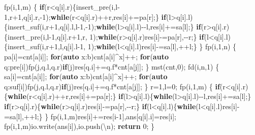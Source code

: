 \documentclass[
]{article}
\newenvironment{Shaded}{}{}
\newcommand{\CharTok}[1]{\textcolor[rgb]{0.25,0.44,0.63}{#1}}
\newcommand{\ControlFlowTok}[1]{\textcolor[rgb]{0.00,0.44,0.13}{\textbf{#1}}}
\newcommand{\DecValTok}[1]{\textcolor[rgb]{0.25,0.63,0.44}{#1}}
\newcommand{\KeywordTok}[1]{\textcolor[rgb]{0.00,0.44,0.13}{\textbf{#1}}}
\newcommand{\NormalTok}[1]{#1}
\newcommand{\SpecialCharTok}[1]{\textcolor[rgb]{0.25,0.44,0.63}{#1}}
\begin{document}
\begin{Shaded}
\begin{Highlighting}[]
\NormalTok{    fp(i,}\DecValTok{1}\NormalTok{,m)}
\NormalTok{    \{}
        \ControlFlowTok{if}\NormalTok{(r\textless{}q[i].r)\{insert\_pre(i,l{-}}\DecValTok{1}\NormalTok{,r+}\DecValTok{1}\NormalTok{,q[i].r,{-}}\DecValTok{1}\NormalTok{);}\ControlFlowTok{while}\NormalTok{(r\textless{}q[i].r)++r,res[i]+=pa[r];\}}
        \ControlFlowTok{if}\NormalTok{(l\textgreater{}q[i].l)\{insert\_suf(i,r+}\DecValTok{1}\NormalTok{,q[i].l,l{-}}\DecValTok{1}\NormalTok{,{-}}\DecValTok{1}\NormalTok{);}\ControlFlowTok{while}\NormalTok{(l\textgreater{}q[i].l){-}{-}l,res[i]+=sa[l];\}}
        \ControlFlowTok{if}\NormalTok{(r\textgreater{}q[i].r)\{insert\_pre(i,l{-}}\DecValTok{1}\NormalTok{,q[i].r+}\DecValTok{1}\NormalTok{,r, }\DecValTok{1}\NormalTok{);}\ControlFlowTok{while}\NormalTok{(r\textgreater{}q[i].r)res[i]{-}=pa[r],{-}{-}r;\}}
        \ControlFlowTok{if}\NormalTok{(l\textless{}q[i].l)\{insert\_suf(i,r+}\DecValTok{1}\NormalTok{,l,q[i].l{-}}\DecValTok{1}\NormalTok{, }\DecValTok{1}\NormalTok{);}\ControlFlowTok{while}\NormalTok{(l\textless{}q[i].l)res[i]{-}=sa[l],++l;\}}
\NormalTok{    \}}
\NormalTok{    fp(i,}\DecValTok{1}\NormalTok{,n)}
\NormalTok{    \{}
\NormalTok{        pa[i]=cnt[a[i]];}
        \ControlFlowTok{for}\NormalTok{(}\KeywordTok{auto}\NormalTok{ x:b)cnt[a[i]\^{}x]++;}
        \ControlFlowTok{for}\NormalTok{(}\KeywordTok{auto}\NormalTok{ q:pre[i])fp(j,q.l,q.r)}\ControlFlowTok{if}\NormalTok{(j)res[q.i]+=q.f*cnt[a[j]];}
\NormalTok{    \}}
\NormalTok{    mst(cnt,}\DecValTok{0}\NormalTok{);}
\NormalTok{    fd(i,n,}\DecValTok{1}\NormalTok{)}
\NormalTok{    \{}
\NormalTok{        sa[i]=cnt[a[i]];}
        \ControlFlowTok{for}\NormalTok{(}\KeywordTok{auto}\NormalTok{ x:b)cnt[a[i]\^{}x]++;}
        \ControlFlowTok{for}\NormalTok{(}\KeywordTok{auto}\NormalTok{ q:suf[i])fp(j,q.l,q.r)}\ControlFlowTok{if}\NormalTok{(j)res[q.i]+=q.f*cnt[a[j]];}
\NormalTok{    \}}
\NormalTok{    r=}\DecValTok{1}\NormalTok{,l=}\DecValTok{0}\NormalTok{;}
\NormalTok{    fp(i,}\DecValTok{1}\NormalTok{,m)}
\NormalTok{    \{}
        \ControlFlowTok{if}\NormalTok{(r\textless{}q[i].r)\{}\ControlFlowTok{while}\NormalTok{(r\textless{}q[i].r)++r,res[i]+=pa[r];\}}
        \ControlFlowTok{if}\NormalTok{(l\textgreater{}q[i].l)\{}\ControlFlowTok{while}\NormalTok{(l\textgreater{}q[i].l){-}{-}l,res[i]+=sa[l];\}}
        \ControlFlowTok{if}\NormalTok{(r\textgreater{}q[i].r)\{}\ControlFlowTok{while}\NormalTok{(r\textgreater{}q[i].r)res[i]{-}=pa[r],{-}{-}r;\}}
        \ControlFlowTok{if}\NormalTok{(l\textless{}q[i].l)\{}\ControlFlowTok{while}\NormalTok{(l\textless{}q[i].l)res[i]{-}=sa[l],++l;\}}
\NormalTok{    \}}
\NormalTok{    fp(i,}\DecValTok{1}\NormalTok{,m)res[i]+=res[i{-}}\DecValTok{1}\NormalTok{],ans[q[i].i]=res[i];}
\NormalTok{    fp(i,}\DecValTok{1}\NormalTok{,m)io.write(ans[i]),io.push(}\CharTok{\textquotesingle{}}\SpecialCharTok{\textbackslash{}n}\CharTok{\textquotesingle{}}\NormalTok{);}
    \ControlFlowTok{return} \DecValTok{0}\NormalTok{;}
\NormalTok{\}}
\end{Highlighting}
\end{Shaded}
\end{document}
